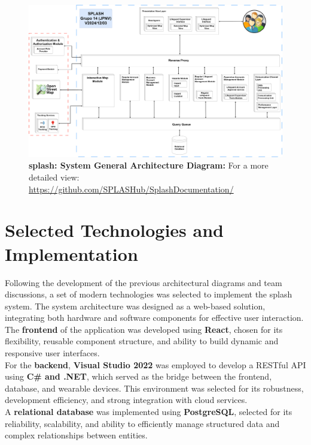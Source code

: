 \begin{figure}[H]
      \centering
      \includegraphics[width=16cm]{figs/general_architecture.png}
      \caption{ \textbf{ \ac{splash}: System General Architecture Diagram:} For a more detailed view: \url{https://github.com/SPLASHub/SplashDocumentation/}}
      \label{fig:general_architecture}
\end{figure}

\newpage
\section{Selected Technologies and Implementation}
\label{section:candidate_tech}

Following the development of the previous architectural diagrams and team discussions, a set of modern technologies was selected to implement the \ac{splash} system. The system architecture was designed as a web-based solution, integrating both hardware and software components for effective user interaction. \\
The \textbf{frontend} of the application was developed using \textbf{React}, chosen for its flexibility, reusable component structure, and ability to build dynamic and responsive user interfaces. \\
For the \textbf{backend}, \textbf{Visual Studio 2022} was employed to develop a RESTful API using \textbf{C\# and .NET}, which served as the bridge between the frontend, database, and wearable devices. This environment was selected for its robustness, development efficiency, and strong integration with cloud services. \\
A \textbf{relational database} was implemented using \textbf{PostgreSQL}, selected for its reliability, scalability, and ability to efficiently manage structured data and complex relationships between entities. \\


